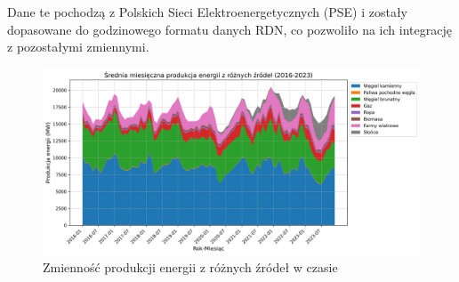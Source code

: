 Dane te pochodzą z Polskich Sieci Elektroenergetycznych (PSE) \cite{PSEOLD} i zostały dopasowane do godzinowego formatu danych RDN, co pozwoliło na ich integrację z pozostałymi zmiennymi. 
\begin{figure}[H]
    \centering
    \includegraphics[width=1.0\textwidth]{../plots/energy/energy_production_time_series_full.png}
    \caption{Zmienność produkcji energii z różnych źródeł w czasie}
    \label{fig:energy-production-time-series-full}
\end{figure}

